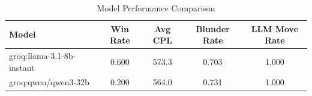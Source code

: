 \begin{table}[h]
\centering
\caption{Model Performance Comparison}
\begin{tabular}{lcccc}
\toprule
Model & Win Rate & Avg CPL & Blunder Rate & LLM Move Rate \\
\midrule
groq:llama-3.1-8b-instant & 0.600 & 573.3 & 0.703 & 1.000 \\
groq:qwen/qwen3-32b & 0.200 & 564.0 & 0.731 & 1.000 \\
\bottomrule
\end{tabular}
\end{table}